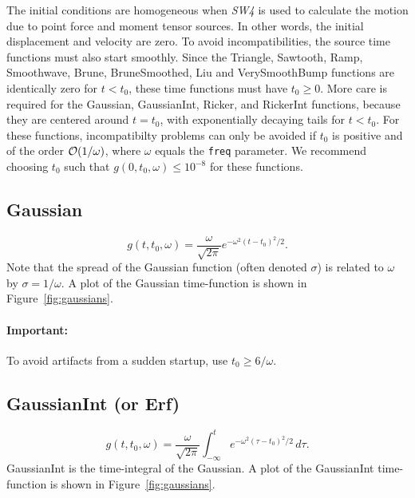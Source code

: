 \documentclass[11pt]{report}
\begin{document}
The initial conditions are homogeneous when \emph{SW4} is used to calculate the motion due to point
force and moment tensor sources. In other words, the initial displacement and velocity are zero. To
avoid incompatibilities, the source time functions must also start smoothly. Since the Triangle,
Sawtooth, Ramp, Smoothwave, Brune, BruneSmoothed, Liu and VerySmoothBump functions are identically
zero for $t<t_0$, these time functions must have $t_0\geq 0$. More care is required for the
Gaussian, GaussianInt, Ricker, and RickerInt functions, because they are centered around $t=t_0$,
with exponentially decaying tails for $t<t_0$. For these functions, incompatibilty problems can only
be avoided if $t_0$ is positive and of the order ${\cal O}(1/\omega)$, where $\omega$ equals the
{\tt freq} parameter. We recommend choosing $t_0$ such that $g(0,t_0,\omega) \leq 10^{-8}$ for these
functions.

\subsection{Gaussian}\label{gaussian}
  \[
  g(t,t_0,\omega) = \dfrac{\omega}{\sqrt{2 \pi}} e^{-\omega^2 (t - t_0)^2 /2}.
  \] 
Note that the spread of the Gaussian function (often denoted $\sigma$) is related to $\omega$ by
$\sigma = 1 / \omega$. A plot of the Gaussian time-function is shown
in Figure~\ref{fig:gaussians}.
\paragraph{Important:} To avoid artifacts from a sudden startup, use
$t_0 \geq 6/\omega$.
\subsection{GaussianInt (or Erf)}\label{gaussianint}
\[
g(t,t_0,\omega) = \dfrac{\omega}{\sqrt{2 \pi}} \int_{-\infty}^t e^{-\omega^2 (\tau - t_0)^2/2}\,d\tau.
\] 
GaussianInt is the time-integral of the Gaussian. A plot of the
GaussianInt time-function is shown in Figure~\ref{fig:gaussians}.
\end{document}
